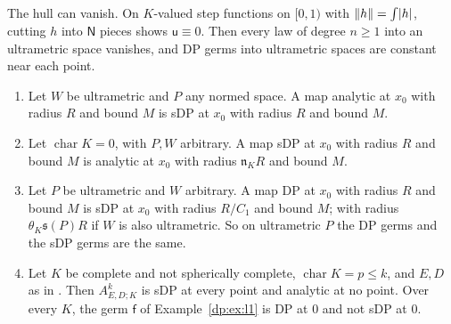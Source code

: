 The hull can vanish. On $K$-valued step functions on $[0,1)$ with $\lVert h\rVert=\int\lvert h\rvert$, cutting $h$ into $\mathsf N$ pieces shows $\mathsf u\equiv0$. Then every law of degree $n\ge1$ into an ultrametric space vanishes, and DP germs into ultrametric spaces are constant near each point.

\begin{proposition}\label{dp:prop:strong-interpolates}
\leavevmode
\begin{enumerate}
\item Let $W$ be ultrametric and $P$ any normed space. A map analytic at $x_0$ with radius $R$ and bound $M$ is sDP at $x_0$ with radius $R$ and bound $M$.
\item Let $\operatorname{char}K=0$, with $P,W$ arbitrary. A map sDP at $x_0$ with radius $R$ and bound $M$ is analytic at $x_0$ with radius $\mathfrak n_KR$ and bound $M$.
\item Let $P$ be ultrametric and $W$ arbitrary. A map DP at $x_0$ with radius $R$ and bound $M$ is sDP at $x_0$ with radius $R/C_1$ and bound $M$; with radius $\theta_K\mathfrak s(P)R$ if $W$ is also ultrametric. So on ultrametric $P$ the DP germs and the sDP germs are the same.
\item Let $K$ be complete and not spherically complete, $\operatorname{char}K=p\le k$, and $E,D$ as in \cite[Theorem~7.2(2)]{I}. Then $A^k_{E,D;K}$ is sDP at every point and analytic at no point. Over every $K$, the germ $\mathsf f$ of Example~\ref{dp:ex:l1} is DP at $0$ and not sDP at $0$.
\end{enumerate}
\end{proposition}

